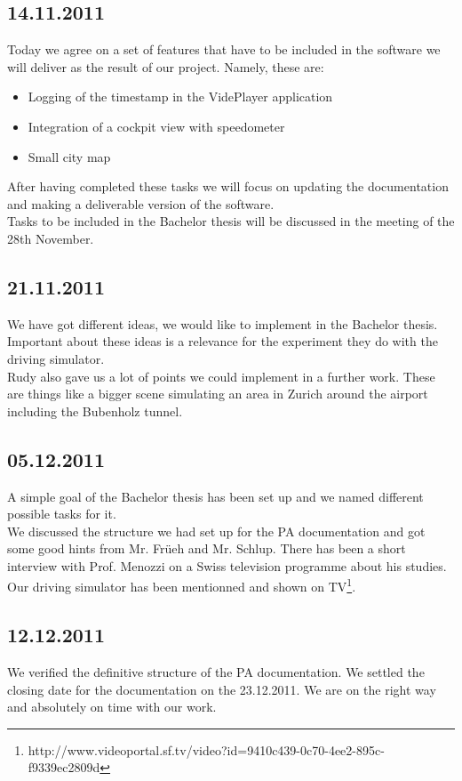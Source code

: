 \subsection*{14.11.2011}
Today we agree on a set of features that have to be included in the software we will deliver as the result of our project. Namely, these are:
\begin{itemize}
\item Logging of the timestamp in the VidePlayer application
\item Integration of a cockpit view with speedometer
\item Small city map
\end{itemize}
After having completed these tasks we will focus on updating the documentation and making a deliverable version of the software.\\
Tasks to be included in the Bachelor thesis will be discussed in the meeting of the 28th November.
\subsection*{21.11.2011}
We have got different ideas, we would like to implement in the Bachelor thesis. Important about these ideas is a relevance for the experiment they do with the driving simulator. \\
Rudy also gave us a lot of points we could implement in a further work. These are things like a bigger scene simulating an area in Zurich around the airport including the Bubenholz tunnel.  
\subsection*{05.12.2011}
A simple goal of the Bachelor thesis has been set up and we named different possible tasks for it. \\
We discussed the structure we had set up for the PA documentation and got some good hints from Mr. Früeh and Mr. Schlup. There has been a short interview with Prof. Menozzi on a Swiss television programme about his studies. Our driving simulator has been mentionned and shown on TV\footnote{http://www.videoportal.sf.tv/video?id=9410c439-0c70-4ee2-895c-f9339ec2809d}.
\subsection*{12.12.2011}
We verified the definitive structure of the PA documentation. We settled the closing date for the documentation on the 23.12.2011. We are on the right way and absolutely on time with our work.
